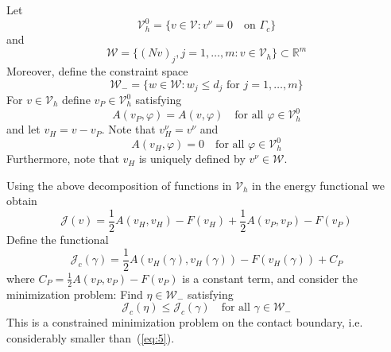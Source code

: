 \documentclass[12pt,a4paper]{article}
\numberwithin{equation}{section}
\numberwithin{table}{section}
\numberwithin{figure}{section}
\newcommand{\R}{\ensuremath{\mathbb{R}}}
\newcommand{\Rm}{\ensuremath{\R^m}}
\newcommand{\W}{\ensuremath{\mathcal{W}}}
\newcommand{\J}{\ensuremath{\mathcal{J}}}
\newcommand{\half}{\ensuremath{\frac{1}{2}}}
\newcommand{\V}{\ensuremath{\mathcal{V}}}
\newcommand{\Vh}{{\mathcal V}_h}
\renewcommand{\phi}{\varphi}
\newcommand{\qforall}{\quad\text{for all }}
\begin{document}
Let
\begin{equation}
  \label{eq:31}
  \Vh^0 = \{ v\in \V \colon v^\nu = 0\quad\text{on }\Gamma_c \}
\end{equation}
and 
\begin{equation}
  \label{eq:32}
  \W = \{ (Nv)_j,j=1,\dotsc,m \colon v\in \Vh\} \subset \Rm
\end{equation}
Moreover, define the constraint space
\begin{equation}
  \label{eq:38}
  \W_{-} = \{ w\in \W \colon w_j\le d_j \text{ for }j=1,\dotsc,m \}
\end{equation}
For $v\in\Vh$ define $v_P \in \Vh^0$ satisfying
\begin{equation}
  \label{eq:34}
  A(v_P, \phi) = A(v, \phi) \qforall \phi\in\Vh^0
\end{equation}
and let $v_H=v-v_P$.  Note that $v_H^\nu = v^\nu$ and
\begin{equation}
  \label{eq:39}
  A(v_H,\phi)=0 \qforall \phi\in\Vh^0
\end{equation}
Furthermore, note that $v_H$ is uniquely defined by $v^\nu\in \W$.

Using the above decomposition of functions in $\Vh$ in the energy functional we obtain
\begin{equation}
  \label{eq:35}
  \J(v) = \half A(v_H, v_H) - F(v_H)
  + \half A(v_P, v_P) - F(v_P)
\end{equation}
Define the functional
\begin{equation}
  \label{eq:46}
  \J_c(\gamma) = \half A(v_H(\gamma), v_H(\gamma)) - F(v_H(\gamma)) + C_P
\end{equation}
where $C_P = \half A(v_P, v_P) - F(v_P)$ is a constant term, and consider the minimization
problem: Find $\eta\in\W_{-}$ satisfying
\begin{equation}
  \label{eq:36}
  \J_c(\eta) \le \J_c(\gamma) \qforall \gamma\in\W_{-}
\end{equation}
This is a constrained minimization problem on the contact boundary, i.e. considerably
smaller than~(\ref{eq:5}).
\end{document}
